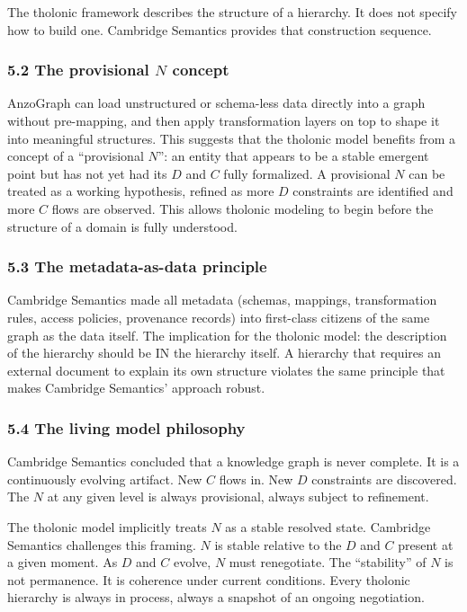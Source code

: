 \documentclass[
  11pt,
  letterpaper,
]{article}
\begin{document}
The tholonic framework describes the structure of a hierarchy. It does
not specify how to build one. Cambridge Semantics provides that
construction sequence.

\subsubsection{\texorpdfstring{5.2 The provisional \(N\)
concept}{5.2 The provisional N concept}}\label{the-provisional-n-concept}

AnzoGraph can load unstructured or schema-less data directly into a
graph without pre-mapping, and then apply transformation layers on top
to shape it into meaningful structures. This suggests that the tholonic
model benefits from a concept of a ``provisional \(N\)'': an entity that
appears to be a stable emergent point but has not yet had its \(D\) and
\(C\) fully formalized. A provisional \(N\) can be treated as a working
hypothesis, refined as more \(D\) constraints are identified and more
\(C\) flows are observed. This allows tholonic modeling to begin before
the structure of a domain is fully understood.

\subsubsection{5.3 The metadata-as-data
principle}\label{the-metadata-as-data-principle}

Cambridge Semantics made all metadata (schemas, mappings, transformation
rules, access policies, provenance records) into first-class citizens of
the same graph as the data itself. The implication for the tholonic
model: the description of the hierarchy should be IN the hierarchy
itself. A hierarchy that requires an external document to explain its
own structure violates the same principle that makes Cambridge
Semantics' approach robust.

\subsubsection{5.4 The living model
philosophy}\label{the-living-model-philosophy}

Cambridge Semantics concluded that a knowledge graph is never complete.
It is a continuously evolving artifact. New \(C\) flows in. New \(D\)
constraints are discovered. The \(N\) at any given level is always
provisional, always subject to refinement.

The tholonic model implicitly treats \(N\) as a stable resolved state.
Cambridge Semantics challenges this framing. \(N\) is stable relative to
the \(D\) and \(C\) present at a given moment. As \(D\) and \(C\)
evolve, \(N\) must renegotiate. The ``stability'' of \(N\) is not
permanence. It is coherence under current conditions. Every tholonic
hierarchy is always in process, always a snapshot of an ongoing
negotiation.
\end{document}
